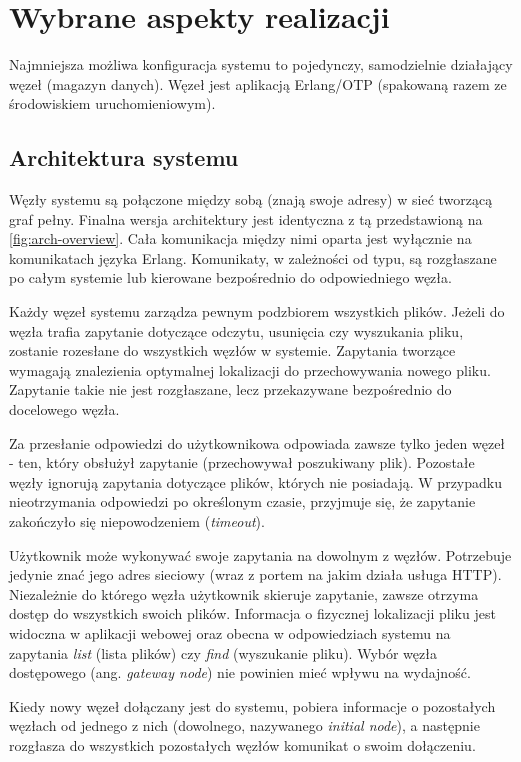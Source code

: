 \section{Wybrane aspekty realizacji}
\label{sec:wybrane-aspekty-realizacji}
Najmniejsza możliwa konfiguracja systemu to pojedynczy, samodzielnie działający
węzeł (magazyn danych). Węzeł jest aplikacją Erlang/OTP \cite{otp-www, otp-lyse} (spakowaną razem ze środowiskiem uruchomieniowym).

\subsection{Architektura systemu}
Węzły systemu są połączone między sobą (znają swoje adresy) w sieć tworzącą graf pełny. Finalna wersja architektury jest identyczna z tą przedstawioną na \autoref{fig:arch-overview}. Cała komunikacja między nimi oparta jest wyłącznie na komunikatach języka Erlang. Komunikaty, w zależności od typu, są rozgłaszane po całym systemie lub kierowane bezpośrednio do odpowiedniego węzła.

Każdy węzeł systemu zarządza pewnym podzbiorem wszystkich plików. Jeżeli do węzła trafia zapytanie dotyczące odczytu, usunięcia czy wyszukania pliku, zostanie rozesłane do wszystkich węzłów w systemie. Zapytania tworzące wymagają znalezienia optymalnej lokalizacji do przechowywania nowego pliku. Zapytanie takie nie jest rozgłaszane, lecz przekazywane bezpośrednio do docelowego węzła.

Za przesłanie odpowiedzi do użytkownikowa odpowiada zawsze tylko jeden węzeł - ten, który obsłużył zapytanie (przechowywał poszukiwany plik). Pozostałe węzły ignorują zapytania dotyczące plików, których nie posiadają. W przypadku nieotrzymania odpowiedzi po określonym czasie, przyjmuje się, że zapytanie zakończyło się niepowodzeniem (\textit{timeout}).

Użytkownik może wykonywać swoje zapytania na dowolnym z węzłów. Potrzebuje jedynie znać jego adres sieciowy (wraz z portem na jakim działa usługa HTTP). Niezależnie do którego węzła użytkownik skieruje zapytanie, zawsze otrzyma dostęp do wszystkich swoich plików. Informacja o fizycznej lokalizacji pliku jest widoczna w aplikacji webowej oraz obecna w odpowiedziach systemu na zapytania \textit{list} (lista plików) czy \textit{find} (wyszukanie pliku). Wybór węzła dostępowego (ang. \textit{gateway node}) nie powinien mieć wpływu na wydajność.

Kiedy nowy węzeł dołączany jest do systemu, pobiera informacje o pozostałych węzłach od jednego z nich (dowolnego, nazywanego \textit{initial node}), a następnie rozgłasza do wszystkich pozostałych węzłów komunikat o swoim dołączeniu.


